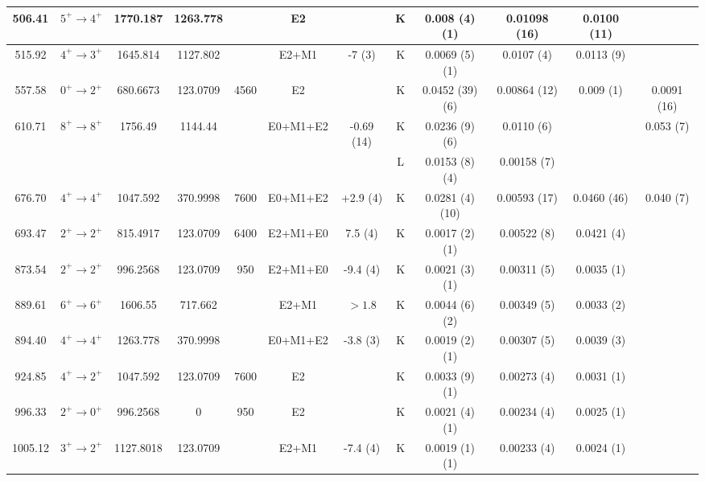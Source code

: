 \begin{landscape}
\begin{longtable}{c|c|c|c|c|c|c|c|c|c|c|c}
        \hline
        506.41	&	$5^+	\rightarrow	4^+$	&	1770.187	&	1263.778	&		&	E2	&		& K &	0.008	(4) (1)	&	0.01098 (16)	&	0.0100 (11)	\\
        \hline
        515.92	&	$4^+	\rightarrow	3^+$	&	1645.814	&	1127.802	&		&	E2+M1	&	-7 (3)	& K &	0.0069	(5) (1)	&	0.0107 (4)	&	0.0113 (9)	\\
        \hline
        557.58	&	$0^+	\rightarrow	2^+$	&	680.6673	&	123.0709	&	4560	&	E2	&		& K &	0.0452	(39) (6)	&	0.00864 (12)	&	0.009 (1) & 0.0091 (16)	\\
        \hline
        610.71	&	$8^+	\rightarrow	8^+$	&	1756.49	&	1144.44	&		&	E0+M1+E2	&	-0.69 (14)	& K &	0.0236	(9) (6)	&	0.0110 (6)	& &	0.053 (7)	\\
	    &				&		&		&		&		&	& L	&	0.0153	(8) (4)	&	0.00158 (7)	&		\\
	    \hline
        676.70	&	$4^+	\rightarrow	4^+$	&	1047.592	&	370.9998	&	7600	&	E0+M1+E2	&	+2.9 (4)	& K &	0.0281	(4) (10)	&	0.00593 (17)	&	0.0460 (46) & 0.040 (7)	\\
        \hline
        693.47	&	$2^+	\rightarrow	2^+$	&	815.4917	&	123.0709	&	6400	&	E2+M1+E0	&	7.5 (4)	& K &	0.0017	(2) (1)	&	0.00522 (8)	&	0.0421 (4)	\\
        \hline
        873.54	&	$2^+	\rightarrow	2^+$	&	996.2568	&	123.0709	&	950	&	E2+M1+E0	&	-9.4 (4)	& K &	0.0021	(3)	(1) &	0.00311 (5)	&	0.0035 (1)	\\
        \hline
        889.61	&	$6^+	\rightarrow	6^+$	&	1606.55	&	717.662	&		&	E2+M1	&	$>1.8$	& K &	0.0044	(6) (2)	&	0.00349 (5)	&	0.0033 (2)	\\
        \hline
        894.40	&	$4^+	\rightarrow	4^+$	&	1263.778	&	370.9998	&		&	E0+M1+E2	&	-3.8 (3)	& K &	0.0019	(2) (1)	&	0.00307 (5)	&	0.0039 (3)	\\
        \hline
        924.85	&	$4^+	\rightarrow	2^+$	&	1047.592	&	123.0709	&	7600	&	E2	&	& K	&	0.0033	(9) (1)	&	0.00273 (4)	&	0.0031 (1)	\\
        \hline
        996.33	&	$2^+	\rightarrow	0^+$	&	996.2568	&	0	&	950	&	E2	&	& K	&	0.0021	(4) (1)	&	0.00234 (4)	&	0.0025 (1)	\\
        \hline
        1005.12	&	$3^+	\rightarrow	2^+$	&	1127.8018	&	123.0709	&		&	E2+M1	&	-7.4 (4) & K	&	0.0019	(1) (1)	&	0.00233 (4)	&	0.0024 (1)	\\
        \bottomrule
    \end{longtable}
\end{landscape}